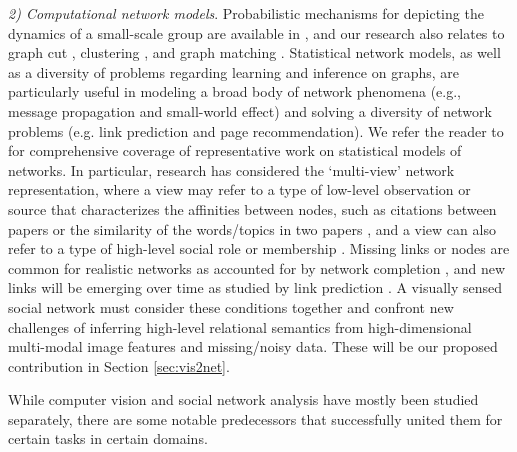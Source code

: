 
\emph{2) Computational network models}. Probabilistic mechanisms for depicting the dynamics of a small-scale group are available in \cite{Basu:meeting,Dong,Brand:CHMM,Choudhury:MHMM,Pan:influence}, and our research also relates to graph cut \cite{Ng:spectral,Boykov:segmentation}, clustering \cite{Filippone:clustering,Xu:clustering}, and graph matching \cite{West:Graph,Caetano:graph}. Statistical network models, as well as a diversity of problems regarding learning and inference on graphs, are particularly useful in modeling a broad body of network phenomena (e.g., message propagation and small-world effect) and solving a diversity of network problems (e.g. link prediction and page recommendation). We refer the reader to \cite{Goldenberg,Kolacyzk,Snijders,Rossi} for comprehensive coverage of representative work on statistical models of networks. In particular, research has considered the `multi-view' network representation, where a view may refer to a type of low-level observation or source that characterizes the affinities between nodes, such as citations between papers or the similarity of the words/topics in two papers \cite{ChangB09,WangMM05}, and a view can also refer to a type of high-level social role or membership \cite{AiroldiBFX08,Kim12}. Missing links or nodes are common for realistic networks as accounted for by network completion \cite{Clauset,Guimera,HannekeX09,KimL11}, and new links will be emerging over time as studied by link prediction \cite{Goldberg,Liben-Nowell,TaskarWAK03}. A visually sensed social network must consider these conditions together and confront new challenges of inferring high-level relational semantics from high-dimensional multi-modal image features and missing/noisy data. These will be our proposed contribution in Section \ref{sec:vis2net}.




While computer vision and social network analysis have mostly been studied separately, there are some notable predecessors that successfully united them for certain tasks in certain domains.

